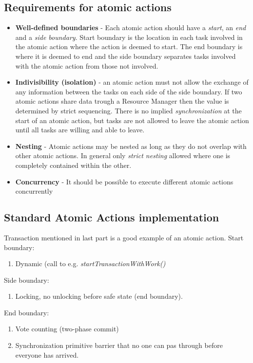 \subsection{Requirements for atomic actions}
\begin{itemize}
\item \textbf{Well-defined boundaries} - Each atomic action should have a \textit{start}, an \textit{end} and a \textit{side boundary}. Start boundary is the location in each task involved in the atomic action where the action is deemed to start. The end boundary is where it is deemed to end and the side boundary separates tasks involved with the atomic action from those not involved.
\item \textbf{Indivisibility (isolation)} - an atomic action must not allow the exchange of any information between the tasks on each side of the side boundary. If two atomic actions share data trough a Resource Manager then the value is determined by strict sequencing. There is no implied \textit{synchronization} at the start of an atomic action, but tasks are not allowed to leave the atomic action until all tasks are willing and able to leave.
\item \textbf{Nesting} - Atomic actions may be nested as long as they do not overlap with other atomic actions. In general only \textit{strict nesting} allowed where one is completely contained within the other.
\item \textbf{Concurrency} - It should be possible to execute different atomic actions concurrently
\end{itemize}

\subsection{Standard Atomic Actions implementation}
Transaction mentioned in last part is a good example of an atomic action.
Start boundary:
\begin{enumerate}
\item Dynamic (call to e.g. \textit{startTransactionWithWork()}
\end{enumerate}
Side boundary:
\begin{enumerate}
\item Locking, no unlocking before safe state (end boundary).
\end{enumerate}
End boundary:
\begin{enumerate}
\item Vote counting (two-phase commit)
\item Synchronization primitive barrier that no one can pas through before everyone has arrived.
\end{enumerate}

